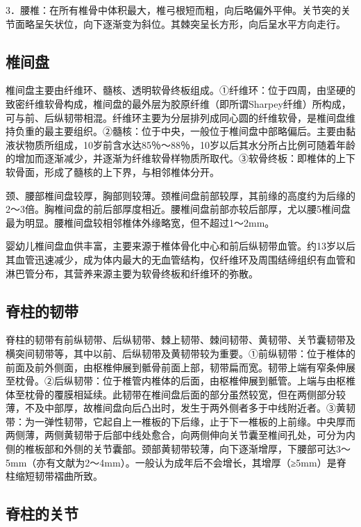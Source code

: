 3．腰椎：在所有椎骨中体积最大，椎弓根短而粗，向后略偏外平伸。关节突的关节面略呈矢状位，向下逐渐变为斜位。其棘突呈长方形，向后呈水平方向走行。

\subsection{椎间盘}

椎间盘主要由纤维环、髓核、透明软骨终板组成。①纤维环：位于四周，由坚硬的致密纤维软骨构成，椎间盘的最外层为胶原纤维（即所谓Sharpey纤维）所构成，可与前、后纵韧带相混。纤维环主要为分层排列成同心圆的纤维软骨，是椎间盘维持负重的最主要组织。②髓核：位于中央，一般位于椎间盘中部略偏后。主要由黏液状物质所组成，10岁前含水达85％～88％，10岁以后其水分所占比例可随着年龄的增加而逐渐减少，并逐渐为纤维软骨样物质所取代。③软骨终板：即椎体的上下软骨面，形成了髓核的上下界，与相邻椎体分开。

颈、腰部椎间盘较厚，胸部则较薄。颈椎间盘前部较厚，其前缘的高度约为后缘的2～3倍。胸椎间盘的前后部厚度相近。腰椎间盘前部亦较后部厚，尤以腰5椎间盘最为明显。腰椎间盘较相邻椎体外缘略宽，但不超过1～2mm。

婴幼儿椎间盘血供丰富，主要来源于椎体骨化中心和前后纵韧带血管。约13岁以后其血管迅速减少，成为体内最大的无血管结构，仅纤维环及周围结缔组织有血管和淋巴管分布，其营养来源主要为软骨终板和纤维环的弥散。

\subsection{脊柱的韧带}

脊柱的韧带有前纵韧带、后纵韧带、棘上韧带、棘间韧带、黄韧带、关节囊韧带及横突间韧带等，其中以前、后纵韧带及黄韧带较为重要。①前纵韧带：位于椎体的前面及前外侧面，由枢椎伸展到骶骨前面上部，韧带扁而宽。韧带上端有窄条伸展至枕骨。②后纵韧带：位于椎管内椎体的后面，由枢椎伸展到骶管。上端与由枢椎体至枕骨的覆膜相延续。此韧带在椎间盘后面的部分虽然较宽，但在两侧部分较薄，不及中部厚，故椎间盘向后凸出时，发生于两外侧者多于中线附近者。③黄韧带：为一弹性韧带，它起自上一椎板的下后缘，止于下一椎板的上前缘。中央厚而两侧薄，两侧黄韧带于后部中线处愈合，向两侧伸向关节囊至椎间孔处，可分为内侧的椎板部和外侧的关节囊部。颈部黄韧带较薄，向下逐渐增厚，下腰部可达3～5mm（亦有文献为2～4mm）。一般认为成年后不会增长，其增厚（≥5mm）是脊柱缩短韧带褶曲所致。

\subsection{脊柱的关节}

